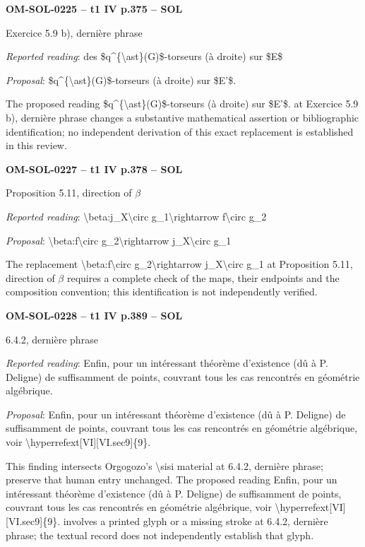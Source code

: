 \par\noindent\textbf{OM-SOL-0225 -- t1 IV p.375 -- SOL}\par
Exercice 5.9 b), dernière phrase\par
\emph{Reported reading}: des \$q\textasciicircum{}\{\textbackslash{}ast\}(G)\$-torseurs (à droite) sur \$E\$\par
\emph{Proposal}: \$q\textasciicircum{}\{\textbackslash{}ast\}(G)\$-torseurs (à droite) sur \$E'\$.\par
The proposed reading \$q\textasciicircum{}\{\textbackslash{}ast\}(G)\$-torseurs (à droite) sur \$E'\$. at Exercice 5.9 b), dernière phrase changes a substantive mathematical assertion or bibliographic identification; no independent derivation of this exact replacement is established in this review.\par
\par\noindent\textbf{OM-SOL-0227 -- t1 IV p.378 -- SOL}\par
Proposition 5.11, direction of \ensuremath{\beta}\par
\emph{Reported reading}: \textbackslash{}beta:j\_X\textbackslash{}circ g\_1\textbackslash{}rightarrow f\textbackslash{}circ g\_2\par
\emph{Proposal}: \textbackslash{}beta:f\textbackslash{}circ g\_2\textbackslash{}rightarrow j\_X\textbackslash{}circ g\_1\par
The replacement \textbackslash{}beta:f\textbackslash{}circ g\_2\textbackslash{}rightarrow j\_X\textbackslash{}circ g\_1 at Proposition 5.11, direction of \ensuremath{\beta} requires a complete check of the maps, their endpoints and the composition convention; this identification is not independently verified.\par
\par\noindent\textbf{OM-SOL-0228 -- t1 IV p.389 -- SOL}\par
6.4.2, dernière phrase\par
\emph{Reported reading}: Enfin, pour un intéressant théorème d'existence (dû à P. Deligne) de suffisamment de points, couvrant tous les cas rencontrés en géométrie algébrique.\par
\emph{Proposal}: Enfin, pour un intéressant théorème d'existence (dû à P. Deligne) de suffisamment de points, couvrant tous les cas rencontrés en géométrie algébrique, voir \textbackslash{}hyperrefext[VI][VI.sec9]\{9\}.\par
This finding intersects Orgogozo's \textbackslash{}sisi material at 6.4.2, dernière phrase; preserve that human entry unchanged. The proposed reading Enfin, pour un intéressant théorème d'existence (dû à P. Deligne) de suffisamment de points, couvrant tous les cas rencontrés en géométrie algébrique, voir \textbackslash{}hyperrefext[VI][VI.sec9]\{9\}. involves a printed glyph or a missing stroke at 6.4.2, dernière phrase; the textual record does not independently establish that glyph.\par
